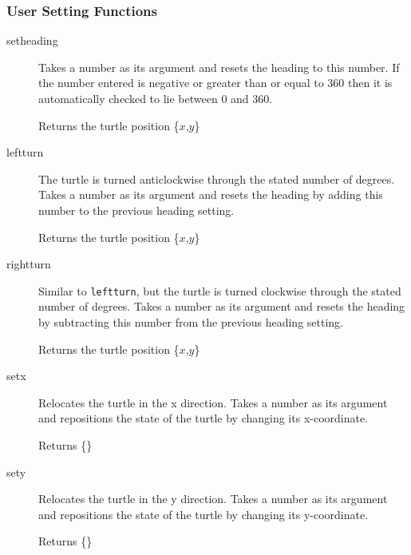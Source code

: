 \subsubsection{User Setting Functions}
\begin{description}
 \item[setheading] Takes a number as its argument and resets the heading
       to this number. If the number entered is negative or greater than
       or equal to 360 then it is automatically checked to lie between 0
       and 360.

       Returns the turtle position \{$x$,$y$\}


 \item[leftturn]  The turtle is turned anticlockwise through the
       stated number of degrees. Takes a number as its argument and
       resets the heading by adding this number to the previous heading
       setting.

       Returns the turtle position \{$x$,$y$\}


 \item[rightturn] Similar to \texttt{leftturn}, but the turtle is turned
       clockwise through the stated number of degrees. Takes a number as
       its argument and resets the heading by subtracting this number from
       the previous heading setting.

       Returns the turtle position \{$x$,$y$\}


 \item[setx] Relocates the turtle in the x direction. Takes a number as
       its argument and repositions the state of the turtle by changing its
       x-coordinate.

       Returns \{\}


 \item[sety] Relocates the turtle in the y direction. Takes a number as   
       its argument and repositions the state of the turtle by changing its
       y-coordinate.

       Returns \{\}



\end{description}
